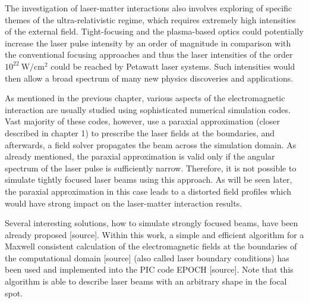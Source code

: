 The investigation of laser-matter interactions also involves exploring of specific themes of the ultra-relativistic regime, which requires extremely high intensities of the external field. Tight-focusing and the plasma-based optics could potentially increase the laser pulse intensity by an order of magnitude in comparison with the conventional focusing approaches and thus the laser intensities of the order $ 10^{22} \ \mathrm{W/cm^2} $ could be reached by Petawatt laser systems. Such intensities would then allow a broad spectrum of many new physics discoveries and applications.

As mentioned in the previous chapter, various aspects of the electromagnetic interaction are usually studied using sophisticated numerical simulation codes. Vast majority of these codes, however, use a paraxial approximation (closer described in chapter 1) to prescribe the laser fields at the boundaries, and afterwards, a field solver propagates the beam across the simulation domain. As already mentioned, the paraxial approximation is valid only if the angular spectrum of the laser pulse is sufficiently narrow. Therefore, it is not possible to simulate tightly focused laser beams using this approach. As will be seen later, the paraxial approximation in this case leads to a distorted field profiles which would have strong impact on the laser-matter interaction results.

Several interesting solutions, how to simulate strongly focused beams, have been already proposed [source]. Within this work, a simple and efficient algorithm for a Maxwell consistent calculation of the electromagnetic fields at the boundaries of the computational domain [source] (also called laser boundary conditions) has been used and implemented into the PIC code EPOCH [source]. Note that this algorithm is able to describe laser beams with an arbitrary shape in the focal spot.